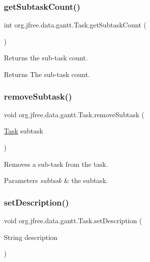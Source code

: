 \subsubsection{\texorpdfstring{get\+Subtask\+Count()}{getSubtaskCount()}}
{\footnotesize\ttfamily int org.\+jfree.\+data.\+gantt.\+Task.\+get\+Subtask\+Count (\begin{DoxyParamCaption}{ }\end{DoxyParamCaption})}

Returns the sub-\/task count.

\begin{DoxyReturn}{Returns}
The sub-\/task count. 
\end{DoxyReturn}
\mbox{\label{classorg_1_1jfree_1_1data_1_1gantt_1_1_task_a9c2a06d96bcd9ee827037f01d2f2a8db}} 
\subsubsection{\texorpdfstring{remove\+Subtask()}{removeSubtask()}}
{\footnotesize\ttfamily void org.\+jfree.\+data.\+gantt.\+Task.\+remove\+Subtask (\begin{DoxyParamCaption}\item[{\mbox{\hyperlink{classorg_1_1jfree_1_1data_1_1gantt_1_1_task}{Task}}}]{subtask }\end{DoxyParamCaption})}

Removes a sub-\/task from the task.


\begin{DoxyParams}{Parameters}
{\em subtask} & the subtask. \\
\hline
\end{DoxyParams}
\mbox{\label{classorg_1_1jfree_1_1data_1_1gantt_1_1_task_a2fd2a50d8a77b8f783ec3481b3b46640}} 
\subsubsection{\texorpdfstring{set\+Description()}{setDescription()}}
{\footnotesize\ttfamily void org.\+jfree.\+data.\+gantt.\+Task.\+set\+Description (\begin{DoxyParamCaption}\item[{String}]{description }\end{DoxyParamCaption})}

